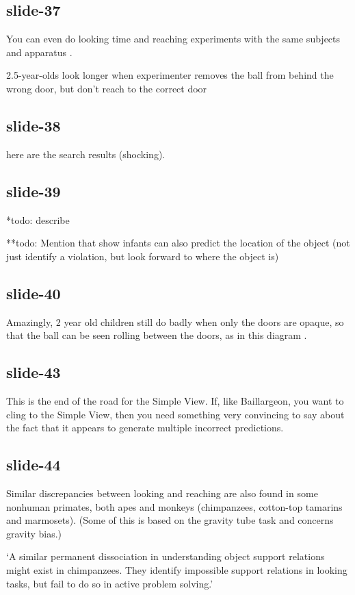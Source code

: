 \documentclass[12pt,\papersize]{extarticle}
\begin{document}
\subsection{slide-37}
You can even do looking time and reaching experiments with the same subjects and apparatus \citep{Hood:2003yg}.

2.5-year-olds look longer when experimenter removes the ball from behind the wrong door, but don't reach to the correct door

\subsection{slide-38}
here are the search results (shocking).

\subsection{slide-39}
*todo: describe

**todo: Mention that \citep{mash:2006_what} show infants can also predict the location of the object (not just identify a violation, but look forward to where the object is)

\subsection{slide-40}
Amazingly, 2 year old children still do badly when only the doors are opaque, so that the
ball can be seen rolling between the doors, as in this diagram \citep{Butler:2002bv}.

\subsection{slide-43}
This is the end of the road for the Simple View.
If, like Baillargeon, you want to cling to the Simple View, then you
need something very convincing to say about the fact that it appears
to generate multiple incorrect predictions.

\subsection{slide-44}
Similar discrepancies between looking and reaching are also found in some
nonhuman primates, both apes and monkeys (chimpanzees, cotton-top tamarins
and marmosets). (Some of this is based on the gravity tube task and
concerns gravity bias.)

‘A similar permanent dissociation in understanding object support relations
      might exist in chimpanzees. They identify impossible support relations in looking tasks,
      but fail to do so in active problem solving.’
\citep{gomez:2005_species}
\end{document}
